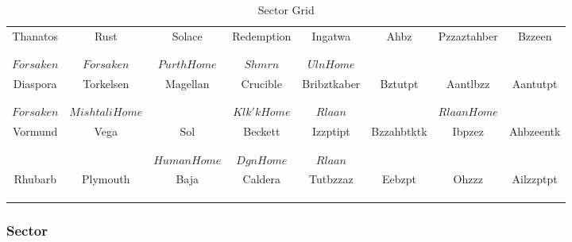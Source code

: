 \begin{table}[h]
{\begin{center}
\begin{tabular}{|c|c|c|c|c|c|c|c|}
Thanatos&	Rust&		Solace&		Redemption&	Ingatwa&	Ahbz&		Pzzaztahber&	Bzzeen \\
 &               &               &               &               &               &               & \\
 &               &               &               &               &               &               & \\
\(Forsaken\)&   \(Forsaken\)     &              \(Purth Home\)& \(Shmrn\)&      \(Uln Home\)&      &               & \\ \hline
Diaspora&	Torkelsen&	Magellan&	Crucible&	Bribztkaber&	Bztutpt&	Aantlbzz&	Aantutpt \\
 &               &               &               &               &               &               & \\
 &               &               &               &               &               &               & \\
\(Forsaken\)&   \(Mishtali Home\)& &            \(Klk'k Home\)& \(Rlaan\)&       &              \(Rlaan Home\)& \\ \hline
Vormund&	Vega&		Sol&		Beckett&	Izzptipt&	Bzzahbtktk&	Ibpzez&		Ahbzeentk \\
 &               &               &               &               &               &               & \\
 &               &               &               &               &               &               & \\
 &               &              \(Human Home\)&   \(Dgn Home\)& \(Rlaan\)&       &               & \\ \hline
Rhubarb&	Plymouth&	Baja&		Caldera&	Tutbzzaz&	Eebzpt&		Ohzzz&		Ailzzptpt \\
 &               &               &               &               &               &               & \\
 &               &               &               &               &               &               & \\
 &               &               &               &               &               &               & \\ \hline
\end{tabular}
\caption{Sector Grid}
\label{table:Sector Grid}
\end{center}
}
\end{table}

\subsubsection{Sector}
